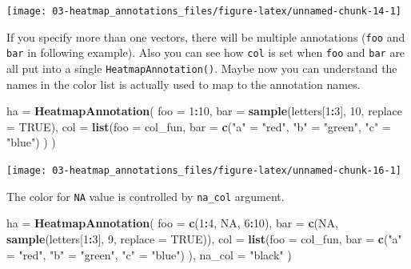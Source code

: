 \documentclass[]{book}
\newenvironment{Shaded}{\begin{snugshade}}{\end{snugshade}}
\newcommand{\KeywordTok}[1]{\textcolor[rgb]{0.13,0.29,0.53}{\textbf{#1}}}
\newcommand{\DataTypeTok}[1]{\textcolor[rgb]{0.13,0.29,0.53}{#1}}
\newcommand{\DecValTok}[1]{\textcolor[rgb]{0.00,0.00,0.81}{#1}}
\newcommand{\StringTok}[1]{\textcolor[rgb]{0.31,0.60,0.02}{#1}}
\newcommand{\OtherTok}[1]{\textcolor[rgb]{0.56,0.35,0.01}{#1}}
\newcommand{\OperatorTok}[1]{\textcolor[rgb]{0.81,0.36,0.00}{\textbf{#1}}}
\newcommand{\NormalTok}[1]{#1}
\theoremstyle{definition}
\theoremstyle{definition}
\theoremstyle{definition}
\theoremstyle{remark}
\begin{document}
\begin{center}\texttt{[image: 03-heatmap\_annotations\_files/figure-latex/unnamed-chunk-14-1]} \end{center}

If you specify more than one vectors, there will be multiple annotations
(\texttt{foo} and \texttt{bar} in following example). Also you can see
how \texttt{col} is set when \texttt{foo} and \texttt{bar} are all put
into a single \texttt{HeatmapAnnotation()}. Maybe now you can understand
the names in the color list is actually used to map to the annotation
names.

\begin{Shaded}
\begin{Highlighting}[]
\NormalTok{ha =}\StringTok{ }\KeywordTok{HeatmapAnnotation}\NormalTok{(}
    \DataTypeTok{foo =} \DecValTok{1}\OperatorTok{:}\DecValTok{10}\NormalTok{, }
    \DataTypeTok{bar =} \KeywordTok{sample}\NormalTok{(letters[}\DecValTok{1}\OperatorTok{:}\DecValTok{3}\NormalTok{], }\DecValTok{10}\NormalTok{, }\DataTypeTok{replace =} \OtherTok{TRUE}\NormalTok{),}
    \DataTypeTok{col =} \KeywordTok{list}\NormalTok{(}\DataTypeTok{foo =}\NormalTok{ col_fun,}
               \DataTypeTok{bar =} \KeywordTok{c}\NormalTok{(}\StringTok{"a"}\NormalTok{ =}\StringTok{ "red"}\NormalTok{, }\StringTok{"b"}\NormalTok{ =}\StringTok{ "green"}\NormalTok{, }\StringTok{"c"}\NormalTok{ =}\StringTok{ "blue"}\NormalTok{)}
\NormalTok{    )}
\NormalTok{)}
\end{Highlighting}
\end{Shaded}

\begin{center}\texttt{[image: 03-heatmap\_annotations\_files/figure-latex/unnamed-chunk-16-1]} \end{center}

The color for \texttt{NA} value is controlled by \texttt{na\_col}
argument.

\begin{Shaded}
\begin{Highlighting}[]
\NormalTok{ha =}\StringTok{ }\KeywordTok{HeatmapAnnotation}\NormalTok{(}
    \DataTypeTok{foo =} \KeywordTok{c}\NormalTok{(}\DecValTok{1}\OperatorTok{:}\DecValTok{4}\NormalTok{, }\OtherTok{NA}\NormalTok{, }\DecValTok{6}\OperatorTok{:}\DecValTok{10}\NormalTok{), }
    \DataTypeTok{bar =} \KeywordTok{c}\NormalTok{(}\OtherTok{NA}\NormalTok{, }\KeywordTok{sample}\NormalTok{(letters[}\DecValTok{1}\OperatorTok{:}\DecValTok{3}\NormalTok{], }\DecValTok{9}\NormalTok{, }\DataTypeTok{replace =} \OtherTok{TRUE}\NormalTok{)),}
    \DataTypeTok{col =} \KeywordTok{list}\NormalTok{(}\DataTypeTok{foo =}\NormalTok{ col_fun,}
               \DataTypeTok{bar =} \KeywordTok{c}\NormalTok{(}\StringTok{"a"}\NormalTok{ =}\StringTok{ "red"}\NormalTok{, }\StringTok{"b"}\NormalTok{ =}\StringTok{ "green"}\NormalTok{, }\StringTok{"c"}\NormalTok{ =}\StringTok{ "blue"}\NormalTok{)}
\NormalTok{    ),}
    \DataTypeTok{na_col =} \StringTok{"black"}
\NormalTok{)}
\end{Highlighting}
\end{Shaded}
\end{document}
